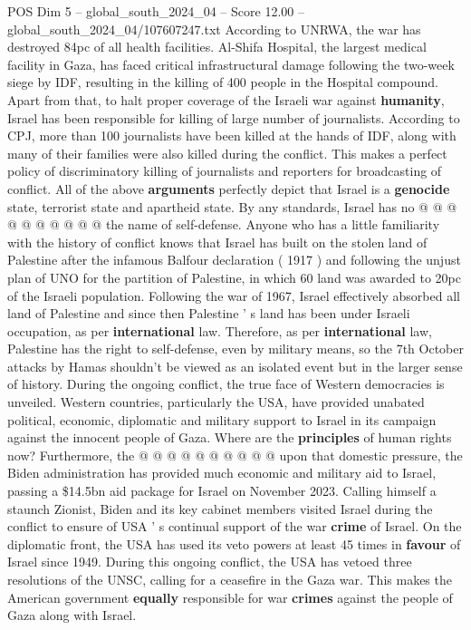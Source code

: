 \begin{textsample}{POS Dim 5 – global\_south\_2024\_04 – Score 12.00 – global\_south\_2024\_04/107607247.txt}
According to UNRWA, the war has destroyed 84pc of all health facilities.
Al-Shifa Hospital, the largest medical facility in Gaza, has faced critical infrastructural damage following the two-week siege by IDF, resulting in the killing of 400 people in the Hospital compound.
Apart from that, to halt proper coverage of the Israeli war against \textbf{humanity}, Israel has been responsible for killing of large number of journalists.
According to CPJ, more than 100 journalists have been killed at the hands of IDF, along with many of their families were also killed during the conflict.
This makes a perfect policy of discriminatory killing of journalists and reporters for broadcasting of conflict.
All of the above \textbf{arguments} perfectly depict that Israel is a \textbf{genocide} state, terrorist state and apartheid state.
By any standards, Israel has no @ @ @ @ @ @ @ @ @ @ the name of self-defense.
Anyone who has a little familiarity with the history of conflict knows that Israel has built on the stolen land of Palestine after the infamous Balfour declaration ( 1917 ) and following the unjust plan of UNO for the partition of Palestine, in which 60 land was awarded to 20pc of the Israeli population.
Following the war of 1967, Israel effectively absorbed all land of Palestine and since then Palestine ' s land has been under Israeli occupation, as per \textbf{international} law.
Therefore, as per \textbf{international} law, Palestine has the right to self-defense, even by military means, so the 7th October attacks by Hamas shouldn't be viewed as an isolated event but in the larger sense of history.
During the ongoing conflict, the true face of Western democracies is unveiled.
Western countries, particularly the USA, have provided unabated political, economic, diplomatic and military support to Israel in its campaign against the innocent people of Gaza.
Where are the \textbf{principles} of human rights now?
Furthermore, the @ @ @ @ @ @ @ @ @ @ upon that domestic pressure, the Biden administration has provided much economic and military aid to Israel, passing a \$14.5bn aid package for Israel on November 2023.
Calling himself a staunch Zionist, Biden and its key cabinet members visited Israel during the conflict to ensure of USA ' s continual support of the war \textbf{crime} of Israel.
On the diplomatic front, the USA has used its veto powers at least 45 times in \textbf{favour} of Israel since 1949.
During this ongoing conflict, the USA has vetoed three resolutions of the UNSC, calling for a ceasefire in the Gaza war.
This makes the American government \textbf{equally} responsible for war \textbf{crimes} against the people of Gaza along with Israel.

\end{textsample}

